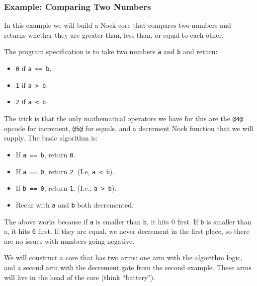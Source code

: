 \documentclass[twoside]{article}
\begin{document}
\subsubsection{Example:  Comparing Two Numbers}

In this example we will build a Nock core that compares two numbers and returns whether they are greater than, less than, or equal to each other.

The program specification is to take two numbers \lstinline[style=inlinecode]{a} and \lstinline[style=inlinecode]{b} and return:

\begin{itemize}
  \item  \lstinline[style=inlinecode]{0} if \lstinline[style=inlinecode]{a == b}.
  \item  \lstinline[style=inlinecode]{1} if \lstinline[style=inlinecode]{a > b}.
  \item  \lstinline[style=inlinecode]{2} if \lstinline[style=inlinecode]{a < b}.
\end{itemize}

The trick is that the only mathematical operators we have for this are the \lstinline[style=inlinecode]{@4@} opcode for increment, \lstinline[style=inlinecode]{@5@} for equals, and a decrement Nock function that we will supply.  The basic algorithm is:

\begin{itemize}
  \item  If \lstinline[style=inlinecode]{a == b}, return \lstinline[style=inlinecode]{0}.
  \item  If \lstinline[style=inlinecode]{a == 0}, return \lstinline[style=inlinecode]{2}.  (I.e, \lstinline[style=inlinecode]{a < b}).
  \item  If \lstinline[style=inlinecode]{b == 0}, return \lstinline[style=inlinecode]{1}.  (I.e., \lstinline[style=inlinecode]{a > b}).
  \item  Recur with \lstinline[style=inlinecode]{a} and \lstinline[style=inlinecode]{b} both decremented.
\end{itemize}

The above works because if \lstinline[style=inlinecode]{a} is smaller than \lstinline[style=inlinecode]{b}, it hits 0 first. If \lstinline[style=inlinecode]{b} is smaller than a, it hits \lstinline[style=inlinecode]{0} first. If they are equal, we never decrement in the first place, so there are no issues with numbers going negative.

We will construct a core that has two arms: one arm with the algorithm logic, and a second arm with the decrement gate from the second example. These arms will live in the head of the core (think ``battery").
\end{document}
